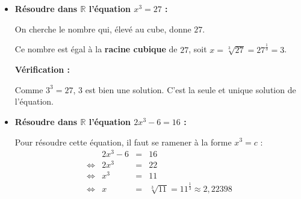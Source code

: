 \begin{methode}[Résoudre une équation du type $x^3=c$]
	\nline
	\begin{itemize}
		\item \textbf{Résoudre dans $\mathbb{R}$ l'équation $x^{3}=27$ :}

		      On cherche le nombre qui, élevé au cube, donne $27$.

		      Ce nombre est égal à la \textbf{racine cubique} de $27$, soit $x=\sqrt[3]{27}=27^{\frac{1}{3}}=3$.

		      \textbf{Vérification :}

		      Comme $3^{3} = 27$, $3$ est bien une solution. C'est la seule et unique solution de l'équation.

		\item \textbf{Résoudre dans $\mathbb{R}$ l'équation $2x^{3}-6=16$ :}

		      Pour résoudre cette équation, il faut se ramener à la forme $x^3=c$ :
		      \[
			      \begin{array}{rrcl}
				           & 2x^{3}-6 & = & 16                                           \\
				      \iff & 2x^{3}   & = & 22                                           \\
				      \iff & x^{3}    & = & 11                                           \\
				      \iff & x        & = & \sqrt[3]{11}=11^{\frac{1}{3}}\approx 2,22398
			      \end{array}
		      \]
	\end{itemize}
\end{methode}
